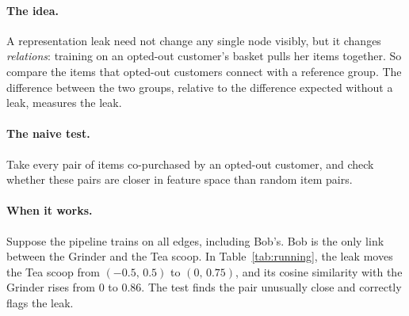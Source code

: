\documentclass[10pt,twocolumn,letterpaper]{article}
\theoremstyle{definition}
\begin{document}
\paragraph{The idea.}
A representation leak need not change any single node visibly, but it changes
\emph{relations}: training on an opted-out customer's basket pulls her items
together. So compare the items that opted-out customers connect with a
reference group. The difference between the two groups, relative to the
difference expected without a leak, measures the leak.

\paragraph{The naive test.}
Take every pair of items co-purchased by an opted-out customer, and check
whether these pairs are closer in feature space than random item pairs.

\paragraph{When it works.}
Suppose the pipeline trains on all edges, including Bob's. Bob is the only
link between the Grinder and the Tea scoop. In Table~\ref{tab:running}, the
leak moves the Tea scoop from $({-}0.5,\,0.5)$ to $(0,\,0.75)$, and its cosine
similarity with the Grinder rises from 0 to 0.86. The test finds the pair
unusually close and correctly flags the leak.
\end{document}

